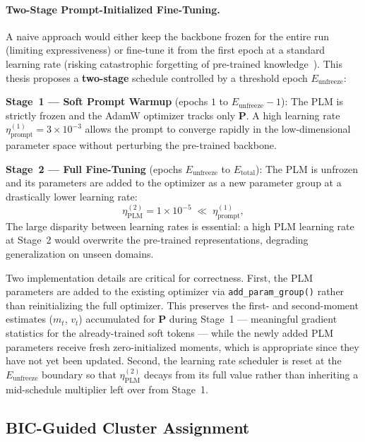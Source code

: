 \documentclass[14pt]{extreport}
\begin{document}
\paragraph{Two-Stage Prompt-Initialized Fine-Tuning.}
A naive approach would either keep the backbone frozen for the entire run (limiting expressiveness) or fine-tune it from the first epoch at a standard learning rate (risking catastrophic forgetting of pre-trained knowledge~\cite{kirkpatrick-etal-2017-overcoming}). This thesis proposes a \textbf{two-stage} schedule controlled by a threshold epoch $E_{\text{unfreeze}}$:

\textbf{Stage~1 — Soft Prompt Warmup} (epochs $1$ to $E_{\text{unfreeze}} - 1$): The PLM is strictly frozen and the AdamW optimizer tracks only $\mathbf{P}$. A high learning rate $\eta_{\text{prompt}}^{(1)} = 3 \times 10^{-3}$ allows the prompt to converge rapidly in the low-dimensional parameter space without perturbing the pre-trained backbone.

\textbf{Stage~2 — Full Fine-Tuning} (epochs $E_{\text{unfreeze}}$ to $E_{\text{total}}$): The PLM is unfrozen and its parameters are added to the optimizer as a new parameter group at a drastically lower learning rate:
\begin{equation}
    \eta_{\text{PLM}}^{(2)} = 1 \times 10^{-5} \;\ll\; \eta_{\text{prompt}}^{(1)},
    \label{eq:two_stage_lr}
\end{equation}
The large disparity between learning rates is essential: a high PLM learning rate at Stage~2 would overwrite the pre-trained representations, degrading generalization on unseen domains.

Two implementation details are critical for correctness. First, the PLM parameters are added to the existing optimizer via \texttt{add\_param\_group()} rather than reinitializing the full optimizer. This preserves the first- and second-moment estimates ($m_t$, $v_t$) accumulated for $\mathbf{P}$ during Stage~1 — meaningful gradient statistics for the already-trained soft tokens — while the newly added PLM parameters receive fresh zero-initialized moments, which is appropriate since they have not yet been updated. Second, the learning rate scheduler is reset at the $E_{\text{unfreeze}}$ boundary so that $\eta_{\text{PLM}}^{(2)}$ decays from its full value rather than inheriting a mid-schedule multiplier left over from Stage~1.

\subsection{BIC-Guided Cluster Assignment}
\end{document}
